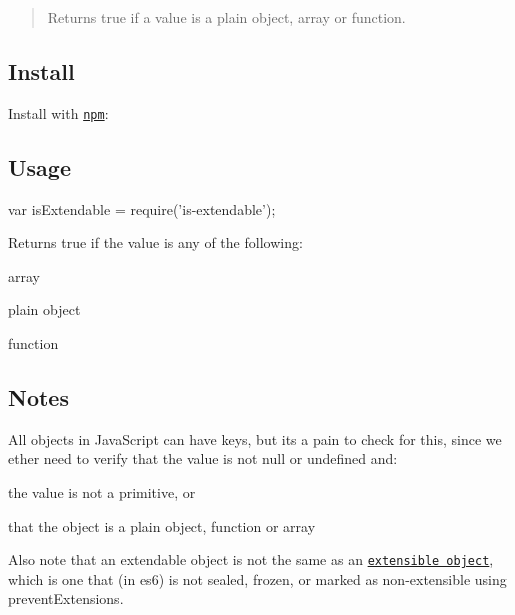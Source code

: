 \begin{quote}
Returns true if a value is a plain object, array or function. \end{quote}


\subsection*{Install}

Install with \href{https://www.npmjs.com/}{\tt npm}\+:




\subsection*{Usage}


\begin{DoxyCode}
var isExtendable = require('is-extendable');
\end{DoxyCode}


Returns true if the value is any of the following\+:


\begin{DoxyItemize}
\item array
\item plain object
\item function
\end{DoxyItemize}

\subsection*{Notes}

All objects in Java\+Script can have keys, but it\textquotesingle{}s a pain to check for this, since we ether need to verify that the value is not {\ttfamily null} or {\ttfamily undefined} and\+:


\begin{DoxyItemize}
\item the value is not a primitive, or
\item that the object is a plain object, function or array
\end{DoxyItemize}

Also note that an {\ttfamily extendable} object is not the same as an \href{https://developer.mozilla.org/en-US/docs/Web/JavaScript/Reference/Global_Objects/Object/isExtensible}{\tt extensible object}, which is one that (in es6) is not sealed, frozen, or marked as non-\/extensible using {\ttfamily prevent\+Extensions}.

